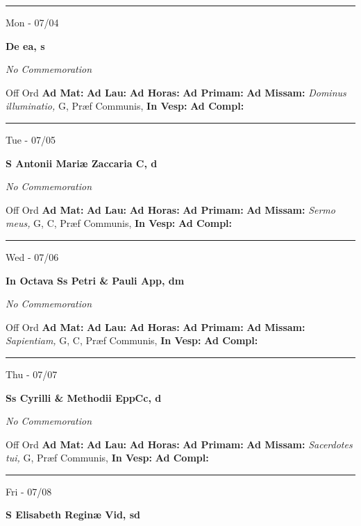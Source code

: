 \documentclass[letterpaper, 10pt]{article}
\begin{document}
\hrule
\begin{center}
Mon - 07/04
\end{center}\textbf{ \large De ea, \textnormal{\normalsize s}}

\textit{No Commemoration}\begin{justify}
Off Ord
\textbf{Ad Mat: }
\textbf{Ad Lau: }
\textbf{Ad Horas: }
\textbf{Ad Primam: }
\textbf{Ad Missam:} \textit{Dominus illuminatio, } G, Præf Communis, 
\textbf{In Vesp: }
\textbf{Ad Compl: }\end{justify}



\hrule
\begin{center}
Tue - 07/05
\end{center}\textbf{ \large S Antonii Mariæ Zaccaria C, \textnormal{\normalsize d}}

\textit{No Commemoration}\begin{justify}
Off Ord
\textbf{Ad Mat: }
\textbf{Ad Lau: }
\textbf{Ad Horas: }
\textbf{Ad Primam: }
\textbf{Ad Missam:} \textit{Sermo meus, } G, C, Præf Communis, 
\textbf{In Vesp: }
\textbf{Ad Compl: }\end{justify}



\hrule
\begin{center}
Wed - 07/06
\end{center}\textbf{ \large In Octava Ss Petri \& Pauli App, \textnormal{\normalsize dm}}

\textit{No Commemoration}\begin{justify}
Off Ord
\textbf{Ad Mat: }
\textbf{Ad Lau: }
\textbf{Ad Horas: }
\textbf{Ad Primam: }
\textbf{Ad Missam:} \textit{Sapientiam, } G, C, Præf Communis, 
\textbf{In Vesp: }
\textbf{Ad Compl: }\end{justify}



\hrule
\begin{center}
Thu - 07/07
\end{center}\textbf{ \large Ss Cyrilli \& Methodii EppCc, \textnormal{\normalsize d}}

\textit{No Commemoration}\begin{justify}
Off Ord
\textbf{Ad Mat: }
\textbf{Ad Lau: }
\textbf{Ad Horas: }
\textbf{Ad Primam: }
\textbf{Ad Missam:} \textit{Sacerdotes tui, } G, Præf Communis, 
\textbf{In Vesp: }
\textbf{Ad Compl: }\end{justify}



\hrule
\begin{center}
Fri - 07/08
\end{center}\textbf{ \large S Elisabeth Reginæ Vid, \textnormal{\normalsize sd}}
\end{document}
